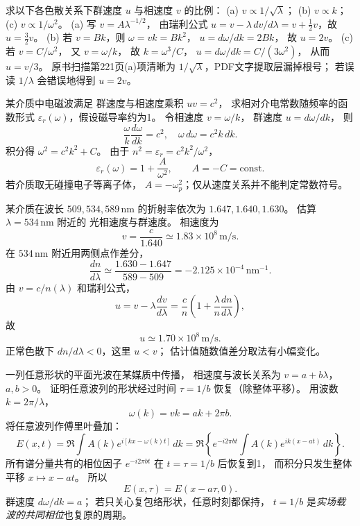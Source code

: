 求以下各色散关系下群速度 $u$ 与相速度 $v$ 的比例：
(a) $v\propto1/\sqrt\lambda$；
(b) $v\propto k$；
(c) $v\propto1/\omega^2$。
\exsolution
(a) 写 $v=A\lambda^{-1/2}$，
由瑞利公式
$u=v-\lambda\,dv/d\lambda
=v+\tfrac12v$，故
$\boxed{u=\tfrac32v}$。
(b) 若 $v=Bk$，则 $\omega=vk=Bk^2$，
$u=d\omega/dk=2Bk$，
故 $\boxed{u=2v}$。
(c) 若 $v=C/\omega^2$，
又 $v=\omega/k$，
故 $k=\omega^3/C$，
$u=d\omega/dk=C/(3\omega^2)$，
从而 $\boxed{u=v/3}$。
\excheck 原书扫描第221页(a)项清晰为
$1/\sqrt{\lambda}$，PDF文字提取层漏掉根号；
若误读 $1/\lambda$ 会错误地得到 $u=2v$。

某介质中电磁波满足
群速度与相速度乘积 $uv=c^2$，
求相对介电常数随频率的函数形式
$\varepsilon_r(\omega)$，假设磁导率约为1。
\exsolution
令相速度 $v=\omega/k$，
群速度 $u=d\omega/dk$，
则
\[
 \frac\omega k\frac{d\omega}{dk}=c^2,
 \quad \omega\,d\omega=c^2 k\,dk.
\]
积分得
$\omega^2=c^2k^2+C$。
由于
$n^2=\varepsilon_r=c^2k^2/\omega^2$，
\[
 \boxed{\varepsilon_r(\omega)=1+\frac{A}{\omega^2}},
 \qquad A=-C=\mathrm{const}.
\]
\excheck 若介质取无碰撞电子等离子体，
$A=-\omega_p^2$；仅从速度关系并不能判定常数符号。

某介质在波长
$509,534,589\,\mathrm{nm}$ 的折射率依次为
$1.647,1.640,1.630$。
估算 $\lambda=534\,\mathrm{nm}$ 附近的
光相速度与群速度。
\exsolution
相速度为
\[
 \boxed{v=\frac c{1.640}\simeq1.83\times10^8\,\mathrm{m/s}}.
\]
在 $534\,\mathrm{nm}$ 附近用两侧点作差分，
\[
 \frac{dn}{d\lambda}\simeq
 \frac{1.630-1.647}{589-509}
 =-2.125\times10^{-4}\,\mathrm{nm^{-1}}.
\]
由 $v=c/n(\lambda)$ 和瑞利公式，
\[
 u=v-\lambda\frac{dv}{d\lambda}
 =\frac c n\left(1+\frac{\lambda}{n}\frac{dn}{d\lambda}\right),
\]
故
\[
 \boxed{u\simeq1.70\times10^8\,\mathrm{m/s}}.
\]
\excheck 正常色散下 $dn/d\lambda<0$，这里 $u<v$；
估计值随数值差分取法有小幅变化。

一列任意形状的平面光波在某媒质中传播，
相速度与波长关系为
$v=a+b\lambda$，$a,b>0$。
证明任意波列的形状经过时间
$\tau=1/b$ 恢复（除整体平移）。
\exsolution
用波数 $k=2\pi/\lambda$，
\[
 \omega(k)=vk=ak+2\pi b.
\]
将任意波列作傅里叶叠加：
\[
 E(x,t)=\Re\!\int A(k)
 e^{i[kx-\omega(k)t]}\,dk
 =\Re\!\left\{
 e^{-i2\pi bt}
 \int A(k)e^{ik(x-at)}\,dk\right\}.
\]
所有谱分量共有的相位因子
$e^{-i2\pi bt}$ 在
$t=\tau=1/b$ 后恢复到1，
而积分只发生整体平移 $x\mapsto x-at$。
所以
\[
 \boxed{E(x,\tau)=E(x-a\tau,0)}.
\]
\excheck 群速度 $d\omega/dk=a$；
若只关心复包络形状，任意时刻都保持，
$t=1/b$ 是\emph{实场载波的共同相位}也复原的周期。

